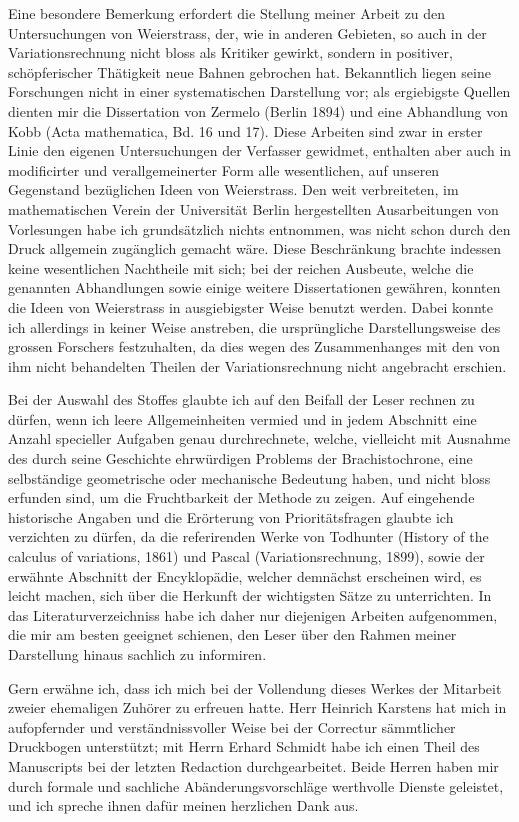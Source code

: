 \documentclass[11pt,a4paper,leqno]{article}
\begin{document}
Eine besondere Bemerkung erfordert die Stellung meiner Arbeit zu den Untersuchungen von Weierstrass, der, wie in anderen Gebieten, so auch in der Variationsrechnung nicht bloss als Kritiker gewirkt, sondern in positiver, schöpferischer Thätigkeit neue Bahnen gebrochen hat. Bekanntlich liegen seine Forschungen nicht in einer systematischen Darstellung vor; als ergiebigste Quellen dienten mir die Dissertation von Zermelo (Berlin 1894) und eine Abhandlung von Kobb (Acta mathematica, Bd. 16 und 17). Diese Arbeiten sind zwar in erster Linie den eigenen Untersuchungen der Verfasser gewidmet, enthalten aber auch in modificirter und verallgemeinerter Form alle wesentlichen, auf unseren Gegenstand bezüglichen Ideen von Weierstrass. Den weit verbreiteten, im mathematischen Verein der Universität Berlin hergestellten Ausarbeitungen von Vorlesungen habe ich grundsätzlich nichts entnommen, was nicht schon durch den Druck allgemein zugänglich gemacht wäre. Diese Beschränkung brachte indessen keine wesentlichen Nachtheile mit sich; bei der reichen Ausbeute, welche die genannten Abhandlungen sowie einige weitere Dissertationen gewähren, konnten die Ideen von Weierstrass in ausgiebigster Weise benutzt werden. Dabei konnte ich allerdings in keiner Weise anstreben, die ursprüngliche Darstellungsweise des grossen Forschers festzuhalten, da dies wegen des Zusammenhanges mit den von ihm nicht behandelten Theilen der Variationsrechnung nicht angebracht erschien.

Bei der Auswahl des Stoffes glaubte ich auf den Beifall der Leser rechnen zu dürfen, wenn ich leere Allgemeinheiten vermied und in jedem Abschnitt eine Anzahl specieller Aufgaben genau durchrechnete, welche, vielleicht mit Ausnahme des durch seine Geschichte ehrwürdigen Problems der Brachistochrone, eine selbständige geometrische oder mechanische Bedeutung haben, und nicht bloss erfunden sind, um die Fruchtbarkeit der Methode zu zeigen. Auf eingehende historische Angaben und die Erörterung von Prioritätsfragen glaubte ich verzichten zu dürfen, da die referirenden Werke von Todhunter (History of the calculus of variations, 1861) und Pascal (Variationsrechnung, 1899), sowie der erwähnte Abschnitt der Encyklopädie, welcher demnächst erscheinen wird, es leicht machen, sich über die Herkunft der wichtigsten Sätze zu unterrichten. In das Literaturverzeichniss habe ich daher nur diejenigen Arbeiten aufgenommen, die mir am besten geeignet schienen, den Leser über den Rahmen meiner Darstellung hinaus sachlich zu informiren.

Gern erwähne ich, dass ich mich bei der Vollendung dieses Werkes der Mitarbeit zweier ehemaligen Zuhörer zu erfreuen hatte. Herr Heinrich Karstens hat mich in aufopfernder und verständnissvoller Weise bei der Correctur sämmtlicher Druckbogen unterstützt; mit Herrn Erhard Schmidt habe ich einen Theil des Manuscripts bei der letzten Redaction durchgearbeitet. Beide Herren haben mir durch formale und sachliche Abänderungsvorschläge werthvolle Dienste geleistet, und ich spreche ihnen dafür meinen herzlichen Dank aus.
\end{document}
